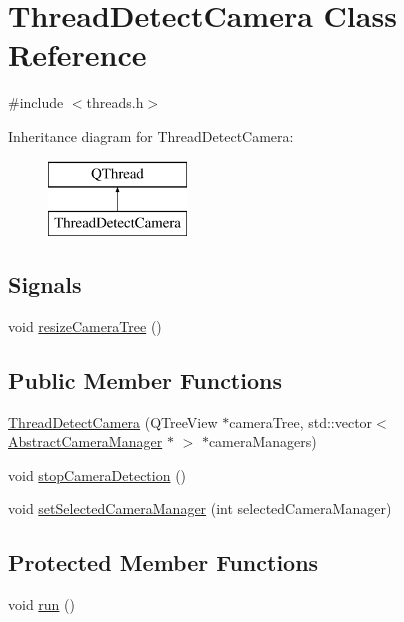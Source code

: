 \hypertarget{class_thread_detect_camera}{}\section{Thread\+Detect\+Camera Class Reference}
\label{class_thread_detect_camera}


{\ttfamily \#include $<$threads.\+h$>$}

Inheritance diagram for Thread\+Detect\+Camera\+:\begin{figure}[H]
\begin{center}
\leavevmode
\includegraphics[height=2.000000cm]{class_thread_detect_camera}
\end{center}
\end{figure}
\subsection*{Signals}
\begin{DoxyCompactItemize}
\item 
void \mbox{\hyperlink{class_thread_detect_camera_a494364e22e852d705ee2ddfd81d279c9}{resize\+Camera\+Tree}} ()
\end{DoxyCompactItemize}
\subsection*{Public Member Functions}
\begin{DoxyCompactItemize}
\item 
\mbox{\hyperlink{class_thread_detect_camera_a1c6b8e5f0c0616b09b1e3a8129073d01}{Thread\+Detect\+Camera}} (Q\+Tree\+View $\ast$camera\+Tree, std\+::vector$<$ \mbox{\hyperlink{class_abstract_camera_manager}{Abstract\+Camera\+Manager}} $\ast$ $>$ $\ast$camera\+Managers)
\item 
void \mbox{\hyperlink{class_thread_detect_camera_a842bc6740ec072adf240e17d77b185de}{stop\+Camera\+Detection}} ()
\item 
void \mbox{\hyperlink{class_thread_detect_camera_a801682460d0afc47ce56d9433bf29b19}{set\+Selected\+Camera\+Manager}} (int selected\+Camera\+Manager)
\end{DoxyCompactItemize}
\subsection*{Protected Member Functions}
\begin{DoxyCompactItemize}
\item 
void \mbox{\hyperlink{class_thread_detect_camera_aa33878a7044810c947e2fb3a6b36db44}{run}} ()
\end{DoxyCompactItemize}


